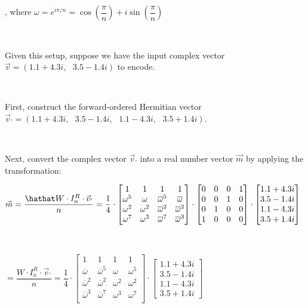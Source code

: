 , where $\omega = e^{i\pi/n} = \cos \left(\dfrac{\pi}{n}\right) + i\sin \left(\dfrac{\pi}{n}\right)$

$ $


Given this setup, suppose we have the input complex vector $\vec{v} = (1.1 + 4.3i, \text{ } 3.5 - 1.4i)$ to encode. 

$ $

First, construct the forward-ordered Hermitian vector $\vec{v}_{'} = (1.1 + 4.3i, \text{ } 3.5 - 1.4i, \text{ } 1.1 - 4.3i, \text{ } 3.5 + 1.4i)$. 

$ $

Next, convert the complex vector $\vec{v}_{'}$ into a real number vector $\vec{m}$ by applying the transformation: 


$\vec{m} = \dfrac{\hathat W \cdot I_n^R \cdot \vec{v}_{'}}{n} = \dfrac{1}{4} \cdot \begin{bmatrix}
1 & 1 & 1 & 1\\
\omega^5 & \omega & \overline{\omega}^5 & \overline{\omega}\\
\omega^2 & \omega^2 & \overline{\omega}^2 & \overline{\omega}^2\\
\omega^7 & \omega^3 & \overline{\omega}^7 & \overline{\omega}^3\\
\end{bmatrix} \cdot 
\begin{bmatrix}
0 & 0 & 0 & 1 \\
0 & 0 & 1 & 0 \\
0 & 1 & 0 & 0 \\
1 & 0 & 0 & 0 
\end{bmatrix}
\cdot
\begin{bmatrix} 1.1 + 4.3i\\3.5 - 1.4i\\1.1 - 4.3i\\3.5 + 1.4i \end{bmatrix}$

$ $

$= \dfrac{W \cdot I_n^R \cdot \vec{v}_{'}}{n} = \dfrac{1}{4} \cdot\begin{bmatrix}
1 & 1 & 1 & 1\\
\overline{\omega} & \overline{\omega}^5 & \omega  & \omega^5\\
\overline{\omega}^2 & \overline{\omega}^2 & \omega^2 & \omega^2\\
\overline{\omega}^3 & \overline{\omega}^7 & \omega^3 & \omega^7\\
\end{bmatrix} 
\cdot
\begin{bmatrix} 1.1 + 4.3i\\3.5 - 1.4i\\1.1 - 4.3i\\3.5 + 1.4i \end{bmatrix}$


